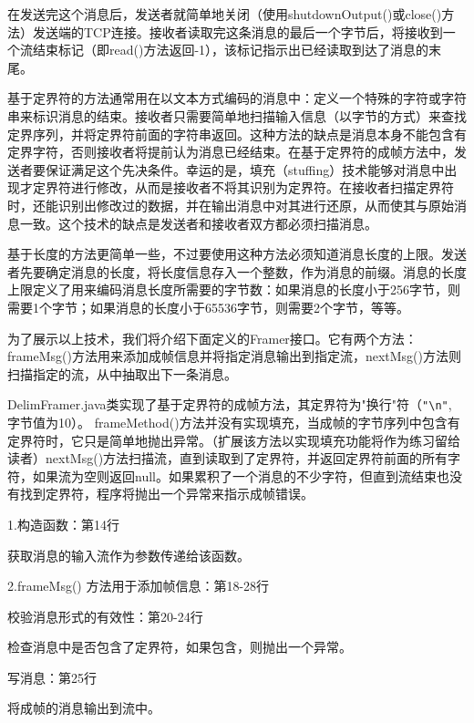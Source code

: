 	在发送完这个消息后，发送者就简单地关闭（使用shutdownOutput()或close()方法）发送端的TCP连接。接收者读取完这条消息的最后一个字节后，将接收到一个流结束标记（即read()方法返回-1），该标记指示出已经读取到达了消息的末尾。 

	基于定界符的方法通常用在以文本方式编码的消息中：定义一个特殊的字符或字符串来标识消息的结束。接收者只需要简单地扫描输入信息（以字节的方式）来查找定界序列，并将定界符前面的字符串返回。这种方法的缺点是消息本身不能包含有定界字符，否则接收者将提前认为消息已经结束。在基于定界符的成帧方法中，发送者要保证满足这个先决条件。幸运的是，填充（stuffing）技术能够对消息中出现才定界符进行修改，从而是接收者不将其识别为定界符。在接收者扫描定界符时，还能识别出修改过的数据，并在输出消息中对其进行还原，从而使其与原始消息一致。这个技术的缺点是发送者和接收者双方都必须扫描消息。 

	基于长度的方法更简单一些，不过要使用这种方法必须知道消息长度的上限。发送者先要确定消息的长度，将长度信息存入一个整数，作为消息的前缀。消息的长度上限定义了用来编码消息长度所需要的字节数：如果消息的长度小于256字节，则需要1个字节；如果消息的长度小于65536字节，则需要2个字节，等等。 

	为了展示以上技术，我们将介绍下面定义的Framer接口。它有两个方法：frameMsg()方法用来添加成帧信息并将指定消息输出到指定流，nextMsg()方法则扫描指定的流，从中抽取出下一条消息。 

	

	DelimFramer.java类实现了基于定界符的成帧方法，其定界符为"换行"符（\verb|"\n"|, 字节值为10）。 frameMethod()方法并没有实现填充，当成帧的字节序列中包含有定界符时，它只是简单地抛出异常。（扩展该方法以实现填充功能将作为练习留给读者）nextMsg()方法扫描流，直到读取到了定界符，并返回定界符前面的所有字符，如果流为空则返回null。如果累积了一个消息的不少字符，但直到流结束也没有找到定界符，程序将抛出一个异常来指示成帧错误。 

	

	1.构造函数：第14行 

	获取消息的输入流作为参数传递给该函数。 

	2.frameMsg() 方法用于添加帧信息：第18-28行 

	校验消息形式的有效性：第20-24行 

	检查消息中是否包含了定界符，如果包含，则抛出一个异常。 

	写消息：第25行 

	将成帧的消息输出到流中。 

